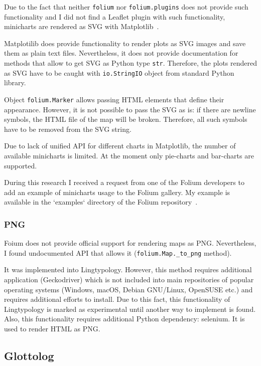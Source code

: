 \documentclass[a4paper,12pt]{article}
\begin{document}
Due to the fact that neither \texttt{folium} nor \texttt{folium.plugins} does not provide such functionality and I did not find a Leaflet plugin with such functionality, minicharts are rendered as SVG with Matplotlib~\parencite{matplotlib}.

Matplotilib does provide functionality to render plots as SVG images and save them as plain text files. Nevertheless, it does not provide documentation for methods that allow to get SVG as Python type \texttt{str}. Therefore, the plots rendered as SVG have to be caught with \texttt{io.StringIO} object from standard Python library.

Object \texttt{folium.Marker} allows passing HTML elements that define their appearance. However, it is not possible to pass the SVG as is: if there are newline symbols, the HTML file of the map will be broken. Therefore, all such symbols have to be removed from the SVG string.

Due to lack of unified API for different charts in Matplotlib, the number of available minicharts is limited. At the moment only pie-charts and bar-charts are supported.

During this research I received a request from one of the Folium developers to add an example of minicharts usage to the Folium gallery. My example is available in the `examples` directory of the Folium repository~\parencite{folium}.

\subsubsection{PNG}

Foium does not provide official support for rendering maps as PNG. Nevertheless, I found undocumented API that allows it (\texttt{folium.Map.\_to\_png} method).

It was implemented into Lingtypology. However, this method requires additional application (Geckodriver) which is not included into main repositories of popular operating systems (Windows, macOS, Debian GNU/Linux, OpenSUSE etc.) and requires additional efforts to install. Due to this fact, this functionality of Lingtypology is marked as experimental until another way to implement is found. Also, this functionality requires additional Python dependency: selenium. It is used to render HTML as PNG.

\subsection{Glottolog}
\end{document}
